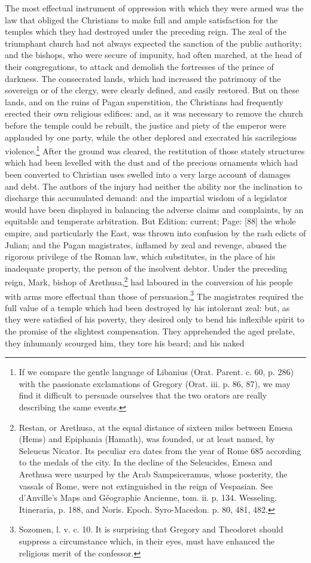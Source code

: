 The most effectual instrument of oppression with which they were armed was the law that obliged the Christians to make full and ample satisfaction for the temples which they had destroyed under the preceding reign. The zeal of the triumphant church had not always expected the sanction of the public authority; and the bishops, who were secure of impunity, had often marched, at the head of their congregations, to attack and demolish the fortresses of the prince of darkness. The consecrated lands, which had increased the patrimony of the sovereign or of the clergy, were clearly defined, and easily restored. But on these lands, and on the ruins of Pagan superstition, the Christians had frequently erected their own religious edifices: and, as it was necessary to remove the church before the temple could be rebuilt, the justice and piety of the emperor were applauded by one party, while the other deplored and execrated his sacrilegious violence.\footnote{If we compare the gentle language of Libanius (Orat. Parent. c. 60, p. 286) with the passionate exclamations of Gregory (Orat. iii. p. 86, 87), we may find it difficult to persuade ourselves that the two orators are really describing the same events.} After the ground was cleared, the restitution of those stately structures which had been levelled with the dust and of the precious ornaments which had been converted to Christian uses swelled into a very large account of damages and debt. The authors of the injury had neither the ability nor the inclination to discharge this accumulated demand: and the impartial wisdom of a legislator would have been displayed in balancing the adverse claims and complaints, by an equitable and temperate arbitration. But Edition: current; Page: [88] the whole empire, and particularly the East, was thrown into confusion by the rash edicts of Julian; and the Pagan magistrates, inflamed by zeal and revenge, abused the rigorous privilege of the Roman law, which substitutes, in the place of his inadequate property, the person of the insolvent debtor. Under the preceding reign, Mark, bishop of Arethusa,\footnote{Restan, or Arethusa, at the equal distance of sixteen miles between Emesa (Hems) and Epiphania (Hamath), was founded, or at least named, by Seleucus Nicator. Its peculiar era dates from the year of Rome 685 according to the medals of the city. In the decline of the Seleucides, Emesa and Arethusa were usurped by the Arab Sampsiceramus, whose posterity, the vassals of Rome, were not extinguished in the reign of Vespasian. See d\texthebrew{}’Anville\texthebrew{}’s Maps and Géographie Ancienne, tom. ii. p. 134. Wesseling. Itineraria, p. 188, and Noris. Epoch. Syro-Macedon. p. 80, 481, 482.} had laboured in the conversion of his people with arms more effectual than those of persuasion.\footnote{Sozomen, l. v. c. 10. It is surprising that Gregory and Theodoret should suppress a circumstance which, in their eyes, must have enhanced the religious merit of the confessor.} The magistrates required the full value of a temple which had been destroyed by his intolerant zeal: but, as they were satisfied of his poverty, they desired only to bend his inflexible spirit to the promise of the slightest compensation. They apprehended the aged prelate, they inhumanly scourged him, they tore his beard; and his naked 